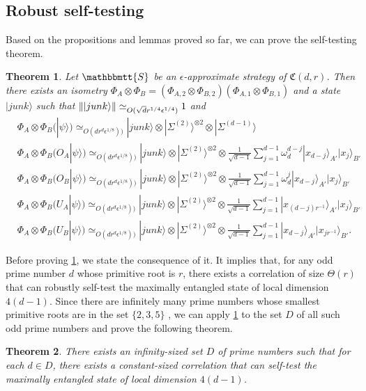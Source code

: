 \documentclass[11pt,letterpaper]{article}
\newcommand{\ket}[1]{|#1\rangle}
\newcommand{\x}{\otimes}
\DeclarePairedDelimiter{\norm}{\lVert}{\rVert}
\newcommand{\1}{\mathbb{1}}
\newcommand{\EPR}[1]{\Sigma^{(#1)}}
\newcommand{\fC}{\mathfrak{C}}
\newcommand{\bS}{\mathbbmtt{S}}
\newcommand{\ep}{\epsilon}
\newcommand{\qe}{\epsilon^{1/4}}
\newcommand{\sd}{\sqrt{d}}
\newcommand{\qr}{r^{1/4}}
\newcommand{\appd}[1]{\simeq_{#1}}
\newtheorem{theorem}{Theorem}[section]
\theoremstyle{definition}
\begin{document}
\subsection{Robust self-testing}
\label{sec:self-test}
Based on the propositions and lemmas proved so far, we can prove the self-testing theorem.
\begin{theorem}
	\label{thm:self-test}
	Let $\bS$ be an $\ep$-approximate strategy of $\fC(d,r)$.
	Then there exists an isometry   
	$\Phi_A \x \Phi_B = (\Phi_{A,2} \x \Phi_{B,2})(\Phi_{A,1}\x\Phi_{B,1})$ and a state $\ket{junk}$
	such that $\norm{\ket{junk}} \appd{O(\sd \qr \qe)} 1$ and 
	\begin{align}
		&\Phi_A \x \Phi_B (\ket{\psi}) \appd{O(d r^{d} \ep^{1/8}))} \ket{junk} \x \ket{\EPR{2}}^{\x 2} \x \ket{\EPR{d-1}}\\	
		&\Phi_A \x \Phi_B (O_A\ket{\psi}) \appd{O(d r^{d}\ep^{1/8}))} \ket{junk} \x \ket{\EPR{2}}^{\x 2} \x
		\frac{1}{\sqrt{d-1}}\sum_{j=1}^{d-1} \omega_d^{d-j}\ket{x_{d-j}}_{A'}\ket{x_j}_{B'} \\
		&\Phi_A \x \Phi_B (O_B\ket{\psi}) \appd{O(d r^{d} \ep^{1/8}))} \ket{junk} \x \ket{\EPR{2}}^{\x 2} \x
		\frac{1}{\sqrt{d-1}}\sum_{j=1}^{d-1} \omega_d^{j}\ket{x_{d-j}}_{A'}\ket{x_j}_{B'}\\
		&\Phi_A \x \Phi_B (U_A\ket{\psi}) \appd{O(d r^{d}  \ep^{1/8}))} \ket{junk} \x \ket{\EPR{2}}^{\x 2} \x
		\frac{1}{\sqrt{d-1}}\sum_{j=1}^{d-1} \ket{x_{(d-j)r^{-1}}}_{A'}\ket{x_j}_{B'} \\
		&\Phi_A \x \Phi_B (U_B\ket{\psi}) \appd{O(d r^{d}\ep^{1/8}))} \ket{junk} \x \ket{\EPR{2}}^{\x 2} \x
		\frac{1}{\sqrt{d-1}}\sum_{j=1}^{d-1} \ket{x_{d-j}}_{A'}\ket{x_{j r^{-1}}}_{B'}.
	\end{align}
\end{theorem}
Before proving \cref{thm:self-test}, we state the consequence of it.
It implies that,
for any odd prime number $d$ whose primitive root is $r$, 
there exists a correlation of size $\Theta(r)$ that can robustly self-test the maximally
entangled state of local dimension $4(d-1)$.
Since there are infinitely many prime numbers
whose smallest primitive roots are in the set $\{2,3,5\}$ \cite{murty1988},
we can apply \cref{thm:self-test} to the set $D$
of all such odd prime
numbers and prove the following theorem.
\begin{theorem}
	\label{thm:infty}
	There exists an infinity-sized set $D$ of prime numbers such that 
	for each $d \in D$, there exists
	a constant-sized correlation that can self-test the maximally entangled state
	of local dimension $4(d-1)$.
\end{theorem}
\end{document}
